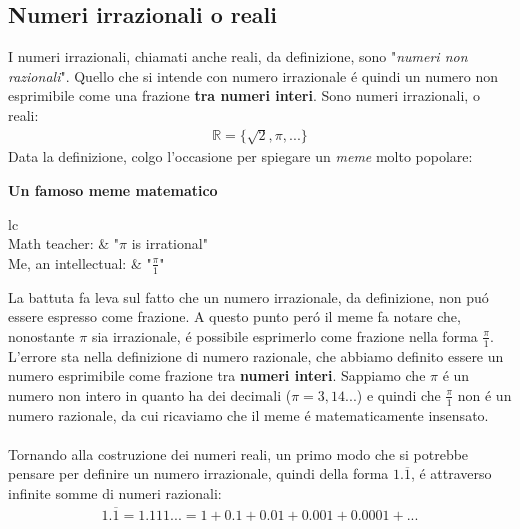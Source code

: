 \documentclass[twoside]{article} %
\begin{document}
	\subsection{Numeri irrazionali o reali}
	I numeri irrazionali, chiamati anche reali, da definizione, sono "\textit{numeri non razionali}". Quello che si intende con numero irrazionale \'e quindi un numero non esprimibile come una frazione \textbf{tra numeri interi}. Sono numeri irrazionali, o reali:
	\begin{gather*}
	 	\mathbb{R}=\{\sqrt{2}, \pi ,...\}
	 \end{gather*}
	 Data la definizione, colgo l'occasione per spiegare un \textit{meme} molto popolare:
	\begin{mdframed}[linewidth=1.5pt]
		\begin{center}
			\textbf{Un famoso meme matematico}
			\vspace*{0.3cm}\\
			\begin{tabular}{lc} 
				\\
				Math teacher: & "$\pi$ is irrational"\\
				Me, an intellectual: & "$\frac{\pi}{1}$"
			\end{tabular}
		\end{center}
	\end{mdframed}
	La battuta fa leva sul fatto che un numero irrazionale, da definizione, non pu\'o essere espresso come frazione. A questo punto per\'o il meme fa notare che, nonostante $\pi$ sia irrazionale, \'e possibile esprimerlo come frazione nella forma $\frac{\pi}{1}$. L'errore sta nella definizione di numero razionale, che abbiamo definito essere un numero esprimibile come frazione tra \textbf{numeri interi}. Sappiamo che $\pi$ \'e un numero non intero in quanto ha dei decimali ($\pi=3,14...$) e quindi che $\frac{\pi}{1}$ non \'e un numero razionale, da cui ricaviamo che il meme \'e matematicamente insensato.\\ \\
	 Tornando alla costruzione dei numeri reali, un primo modo che si potrebbe pensare per definire un numero irrazionale, quindi della forma $1.\overline{1}$, \'e attraverso infinite somme di numeri razionali:
	 \begin{gather*}
	 	1.\overline{1}=1.111...=1+0.1+0.01+0.001+0.0001+...
	 \end{gather*}
\end{document}
